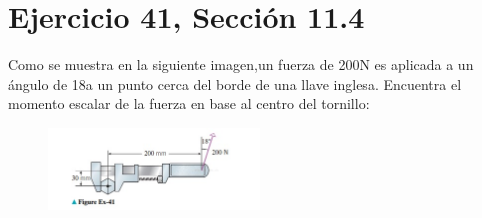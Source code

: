 \documentclass[11pt,letterpaper]{article}
\begin{document}
\section{Ejercicio 41, Sección 11.4}
Como se muestra en la siguiente imagen,un fuerza de 200N es aplicada a un ángulo de 18\degree a un punto cerca del borde de una llave inglesa. Encuentra el momento escalar de la fuerza en base al centro del tornillo:
\begin{figure}[h]
    \centering
    \includegraphics[width=0.5\textwidth]{imagenes/Figure_Ex-41.png}
\end{figure}
\end{document}
